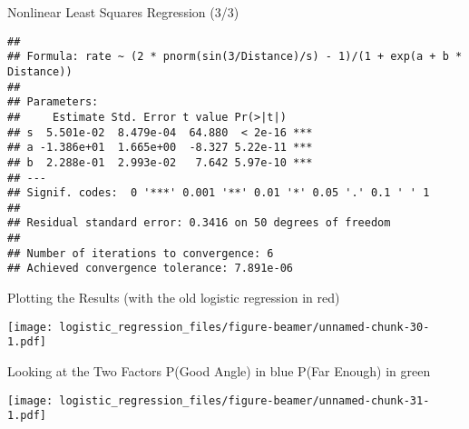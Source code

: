\documentclass[
  ignorenonframetext,
]{beamer}
\begin{document}
\begin{frame}[fragile]{Nonlinear Least Squares Regression (3/3)}
\protect\hypertarget{nonlinear-least-squares-regression-33}{}
\begin{verbatim}
## 
## Formula: rate ~ (2 * pnorm(sin(3/Distance)/s) - 1)/(1 + exp(a + b * Distance))
## 
## Parameters:
##     Estimate Std. Error t value Pr(>|t|)    
## s  5.501e-02  8.479e-04  64.880  < 2e-16 ***
## a -1.386e+01  1.665e+00  -8.327 5.22e-11 ***
## b  2.288e-01  2.993e-02   7.642 5.97e-10 ***
## ---
## Signif. codes:  0 '***' 0.001 '**' 0.01 '*' 0.05 '.' 0.1 ' ' 1
## 
## Residual standard error: 0.3416 on 50 degrees of freedom
## 
## Number of iterations to convergence: 6 
## Achieved convergence tolerance: 7.891e-06
\end{verbatim}
\end{frame}

\begin{frame}{Plotting the Results}
\protect\hypertarget{plotting-the-results}{}
(with the old logistic regression in red)

\texttt{[image: logistic\_regression\_files/figure-beamer/unnamed-chunk-30-1.pdf]}
\end{frame}

\begin{frame}{Looking at the Two Factors}
\protect\hypertarget{looking-at-the-two-factors}{}
P(Good Angle) in blue P(Far Enough) in green

\texttt{[image: logistic\_regression\_files/figure-beamer/unnamed-chunk-31-1.pdf]}
\end{frame}
\end{document}
